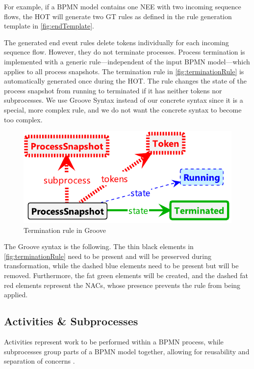 \documentclass{lmcs} %
\begin{document}
For example, if a BPMN model contains one \textsf{NEE} with two incoming sequence flows, the HOT will generate two GT rules as defined in the rule generation template in \autoref{fig:endTemplate}.

The generated end event rules delete tokens individually for each incoming sequence flow.
However, they do not terminate processes.
Process termination is implemented with a generic rule---independent of the input BPMN model---which applies to all process snapshots.
The termination rule in \autoref{fig:terminationRule} is automatically generated once during the HOT.
The rule changes the state of the process snapshot from running to terminated if it has neither tokens nor subprocesses.
We use Groove Syntax instead of our concrete syntax since it is a special, more complex rule, and we do not want the concrete syntax to become too complex.

\begin{figure}[ht]
    \centering
    \includegraphics[width=.4\textwidth]{images/Terminate.pdf}
    \caption{Termination rule in Groove}
    \label{fig:terminationRule}
\end{figure}

The Groove syntax is the following.
The thin black elements in \autoref{fig:terminationRule} need to be present and will be preserved during transformation, while the dashed blue elements need to be present but will be removed.
Furthermore, the fat green elements will be created, and the dashed fat red elements represent the NACs, whose presence prevents the rule from being applied.

\subsection{Activities \& Subprocesses}
Activities represent work to be performed within a BPMN process, while subprocesses group parts of a BPMN model together, allowing for reusability and separation of concerns \cite{objectmanagementgroupBusinessProcessModel2013}.
\end{document}
